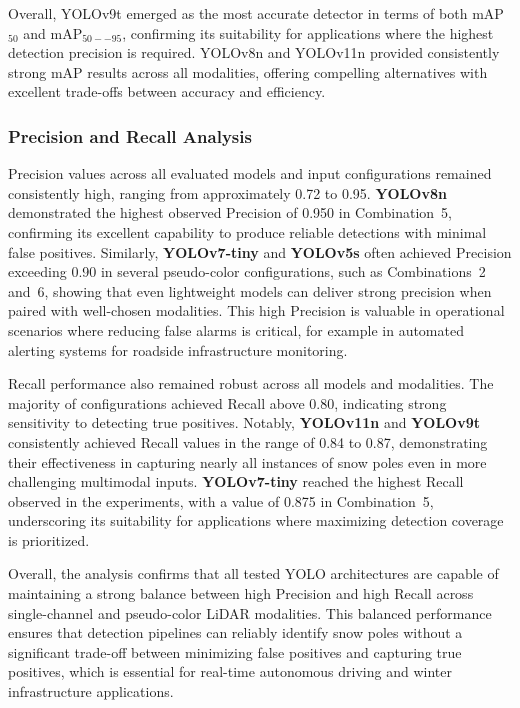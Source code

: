 \documentclass[runningheads]{llncs}
\begin{document}
Overall, YOLOv9t emerged as the most accurate detector in terms of both mAP$_{50}$ and mAP$_{50--95}$, confirming its suitability for applications where the highest detection precision is required. YOLOv8n and YOLOv11n provided consistently strong mAP results across all modalities, offering compelling alternatives with excellent trade-offs between accuracy and efficiency.



\subsubsection{Precision and Recall Analysis}

Precision values across all evaluated models and input configurations remained consistently high, ranging from approximately 0.72 to 0.95. \textbf{YOLOv8n} demonstrated the highest observed Precision of 0.950 in Combination~5, confirming its excellent capability to produce reliable detections with minimal false positives. Similarly, \textbf{YOLOv7-tiny} and \textbf{YOLOv5s} often achieved Precision exceeding 0.90 in several pseudo-color configurations, such as Combinations~2 and~6, showing that even lightweight models can deliver strong precision when paired with well-chosen modalities. This high Precision is valuable in operational scenarios where reducing false alarms is critical, for example in automated alerting systems for roadside infrastructure monitoring.

Recall performance also remained robust across all models and modalities. The majority of configurations achieved Recall above 0.80, indicating strong sensitivity to detecting true positives. Notably, \textbf{YOLOv11n} and \textbf{YOLOv9t} consistently achieved Recall values in the range of 0.84 to 0.87, demonstrating their effectiveness in capturing nearly all instances of snow poles even in more challenging multimodal inputs. \textbf{YOLOv7-tiny} reached the highest Recall observed in the experiments, with a value of 0.875 in Combination~5, underscoring its suitability for applications where maximizing detection coverage is prioritized.

Overall, the analysis confirms that all tested YOLO architectures are capable of maintaining a strong balance between high Precision and high Recall across single-channel and pseudo-color LiDAR modalities. This balanced performance ensures that detection pipelines can reliably identify snow poles without a significant trade-off between minimizing false positives and capturing true positives, which is essential for real-time autonomous driving and winter infrastructure applications.
\end{document}
